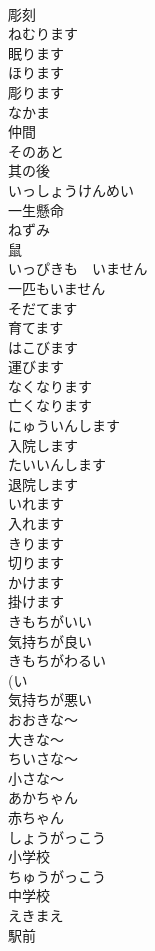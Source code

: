 \documentclass[8pt]{extreport}
\begin{document}
\begin{CJK}{UTF8}{min}
\\	彫刻		
\\	ねむります	
\\	眠ります		
\\	ほります	
\\	彫ります		
\\	なかま	
\\	仲間		
\\	そのあと	
\\	其の後		
\\	いっしょうけんめい	
\\	一生懸命		
\\	ねずみ	
\\	鼠		
\\	いっぴきも　いません	
\\	一匹もいません		
\\	そだてます	
\\	育てます	
\\	はこびます	
\\	運びます	
\\	なくなります	
\\	亡くなります	
\\	にゅういんします	
\\	入院します	
\\	たいいんします	
\\	退院します		
\\	いれます 
\\	入れます		
\\	きります	
\\	切ります
\\	かけます	
\\	掛けます
\\	きもちがいい	
\\	気持ちが良い	
\\	きもちがわるい	
\\	(い
\\	気持ちが悪い	
\\	おおきな〜	
\\	大きな〜		
\\	ちいさな〜	
\\	小さな〜		
\\	あかちゃん	
\\	赤ちゃん	
\\	しょうがっこう	
\\	小学校	
\\	ちゅうがっこう	
\\	中学校	
\\	えきまえ	
\\	駅前	

\end{CJK}
\end{document}
